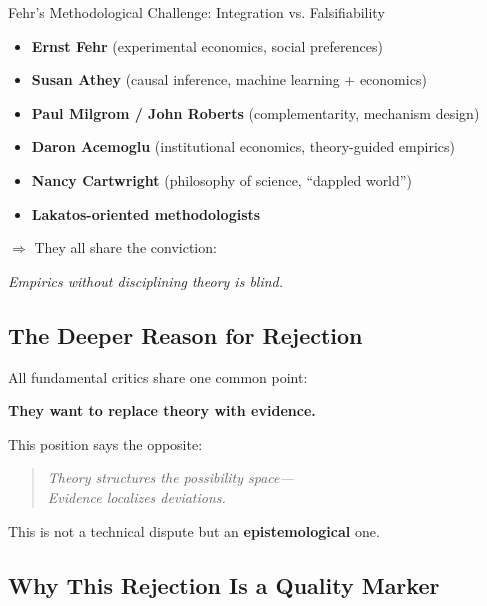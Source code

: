 \begin{chapter}{Fehr's Methodological Challenge: Integration vs. Falsifiability}
\begin{itemize}[noitemsep]
    \item \textbf{Ernst Fehr} (experimental economics, social preferences)
    \item \textbf{Susan Athey} (causal inference, machine learning + economics)
    \item \textbf{Paul Milgrom / John Roberts} (complementarity, mechanism design)
    \item \textbf{Daron Acemoglu} (institutional economics, theory-guided empirics)
    \item \textbf{Nancy Cartwright} (philosophy of science, ``dappled world'')
    \item \textbf{Lakatos-oriented methodologists}
\end{itemize}

$\Rightarrow$ They all share the conviction:

\begin{tcolorbox}[colback=green!5!white,colframe=green!75!black]
\begin{center}
\textit{Empirics without disciplining theory is blind.}
\end{center}
\end{tcolorbox}

\subsection{The Deeper Reason for Rejection}

All fundamental critics share one common point:

\begin{tcolorbox}[colback=red!5!white,colframe=red!75!black]
\begin{center}
\textbf{They want to replace theory with evidence.}
\end{center}
\end{tcolorbox}

This position says the opposite:

\begin{quote}
\textit{Theory structures the possibility space---\\
Evidence localizes deviations.}
\end{quote}

This is not a technical dispute but an \textbf{epistemological} one.

\subsection{Why This Rejection Is a Quality Marker}


\end{chapter}
